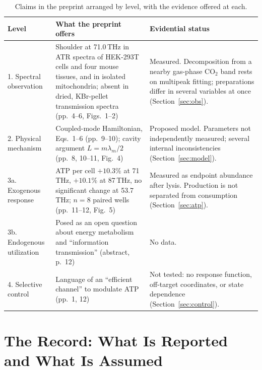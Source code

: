 \documentclass[11pt]{article}
\theoremstyle{plain}
\theoremstyle{definition}
\theoremstyle{remark}
\begin{document}
\begin{table}[ht]
\centering
\small
\begin{tabularx}{\textwidth}{@{}p{2.5cm}XX@{}}
\toprule
Level & What the preprint offers & Evidential status \\
\midrule
1. Spectral observation & Shoulder at 71.0\,THz in ATR spectra of HEK-293T cells and four mouse tissues, and in isolated mitochondria; absent in dried, KBr-pellet transmission spectra (pp.~4--6, Figs.~1--2) & Measured. Decomposition from a nearby gas-phase CO$_2$ band rests on multipeak fitting; preparations differ in several variables at once (Section~\ref{sec:obs}). \\
2. Physical mechanism & Coupled-mode Hamiltonian, Eqs.~1--6 (pp.~9--10); cavity argument $L=m\lambda_m/2$ (pp.~8, 10--11, Fig.~4) & Proposed model. Parameters not independently measured; several internal inconsistencies (Section~\ref{sec:model}). \\
3a. Exogenous response & ATP per cell $+10.3\%$ at 71\,THz, $+10.1\%$ at 87\,THz, no significant change at 53.7\,THz; $n=8$ paired wells (pp.~11--12, Fig.~5) & Measured as endpoint abundance after lysis. Production is not separated from consumption (Section~\ref{sec:atp}). \\
3b. Endogenous utilization & Posed as an open question about energy metabolism and ``information transmission'' (abstract, p.~12) & No data. \\
4. Selective control & Language of an ``efficient channel'' to modulate ATP (pp.~1, 12) & Not tested: no response function, off-target coordinates, or state dependence (Section~\ref{sec:control}). \\
\bottomrule
\end{tabularx}
\caption{Claims in the preprint arranged by level, with the evidence offered at each.}
\label{tab:levels}
\end{table}

\section{The Record: What Is Reported and What Is Assumed}
\label{sec:record}
\end{document}
